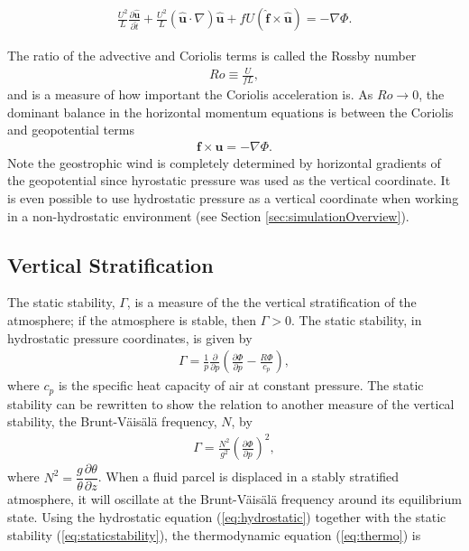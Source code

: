 \begin{align}
\frac{U^2}{L} \frac{\partial \mathbf{\hat{u}}}{\partial \hat{t}} + \frac{U^2}{L} (\mathbf{\hat{u}} \cdot \nabla) \mathbf{\hat{u}} + fU (\mathbf{\hat{f}} \times \mathbf{\hat{u}}) = -\nabla \Phi.
\end{align}

The ratio of the advective and Coriolis terms is called the Rossby number \cite{Vallis2006} 
\begin{align}
Ro \equiv \frac{U}{fL},
\end{align}
and is a measure of how important the Coriolis acceleration is. As $Ro \to 0$, the dominant balance in the horizontal momentum equations is between the Coriolis and geopotential terms 
\begin{align}
\mathbf{f}\times\mathbf{u} = -\nabla \Phi.
\end{align}
Note the geostrophic wind is completely determined by horizontal gradients of the geopotential since hyrostatic pressure was used as the vertical coordinate. It is even possible to use hydrostatic pressure as a vertical coordinate when working in a non-hydrostatic environment (see Section \ref{sec:simulationOverview}).

\subsection{Vertical Stratification}
The static stability, $\Gamma$, is a measure of the the vertical stratification of the atmosphere; if the atmosphere is stable, then $\Gamma > 0$. The static stability, in hydrostatic pressure coordinates, is given by
\begin{align}
\Gamma = \frac{1}{p} \frac{\partial}{\partial p}\left( \frac{\partial \Phi}{\partial p} - \frac{R \Phi}{c_p}\right) \label{eq:staticstability},
\end{align}
where $c_p$ is the specific heat capacity of air at constant pressure. The static stability can be rewritten to show the relation to another measure of the vertical stability, the Brunt-V\"ais\"al\"a frequency, $N$, by 
\begin{align}
\Gamma = \frac{N^2}{g^2} \left( \frac{\partial \Phi}{\partial p}\right)^2,
\end{align}
where $N^2 = \dfrac{g}{\theta} \dfrac{\partial \theta}{\partial z}$. When a fluid parcel is displaced in a stably stratified atmosphere, it will oscillate at the Brunt-V\"ais\"al\"a frequency around its equilibrium state.  Using the hydrostatic equation (\ref{eq:hydrostatic}) together with the static stability (\ref{eq:staticstability}), the thermodynamic equation (\ref{eq:thermo}) is


